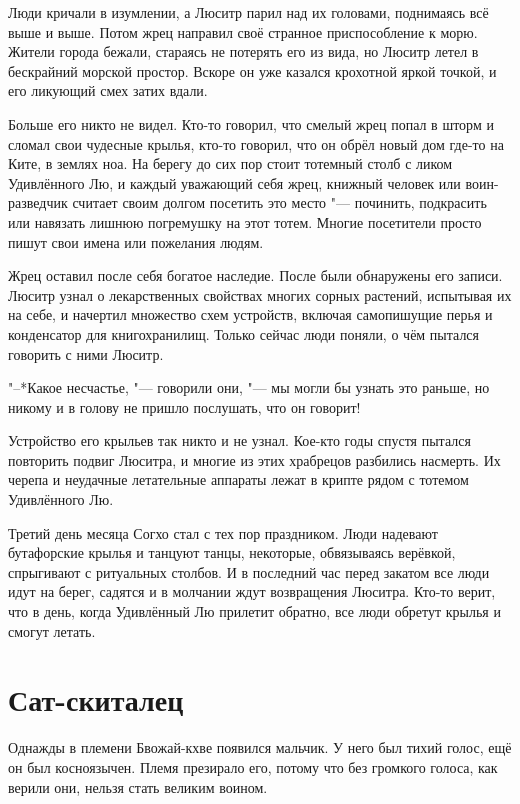 \documentclass[a4paper,10pt]{book}
\begin{document}
Люди кричали в изумлении, а Люситр парил над их головами, поднимаясь всё выше и 
выше. Потом жрец направил своё странное приспособление к морю. Жители города 
бежали, стараясь не потерять его из вида, но Люситр летел в бескрайний морской 
простор. Вскоре он уже казался крохотной яркой точкой, и его ликующий смех 
затих вдали.

Больше его никто не видел. Кто-то говорил, что смелый жрец попал в шторм и 
сломал свои чудесные крылья, кто-то говорил, что он обрёл новый дом где-то на 
Ките, в землях ноа. На берегу до сих пор стоит тотемный столб с ликом 
Удивлённого Лю, и каждый уважающий себя жрец, книжный человек или 
воин-разведчик считает своим долгом посетить это место "--- починить, 
подкрасить 
или навязать лишнюю погремушку на этот тотем. Многие посетители просто пишут 
свои имена или пожелания людям.

Жрец оставил после себя богатое наследие. После были обнаружены его записи.
Люситр узнал о лекарственных свойствах многих сорных растений, испытывая их на 
себе, 
и начертил множество схем устройств, включая самопишущие перья и конденсатор 
для книгохранилищ. Только сейчас люди поняли, о чём пытался говорить с ними 
Люситр.

"--*Какое несчастье, "--- говорили они, "--- мы могли бы узнать это раньше,
но никому и в голову не пришло послушать, что он говорит!

Устройство его крыльев так никто и не узнал. Кое-кто годы 
спустя пытался повторить подвиг Люситра, и многие из этих храбрецов разбились 
насмерть. Их черепа и неудачные летательные аппараты лежат в крипте рядом с 
тотемом Удивлённого Лю.

Третий день месяца Согхо стал с тех пор праздником. Люди надевают 
бутафорские крылья и танцуют танцы, некоторые, обвязываясь верёвкой, спрыгивают 
с ритуальных столбов. И в последний час перед закатом все люди идут на берег, 
садятся и в молчании ждут возвращения Люситра. Кто-то верит, что в день, когда 
Удивлённый Лю прилетит обратно, все люди обретут крылья и смогут летать.


\section{Сат-скиталец}

Однажды в племени Бвожай-кхве появился мальчик. У него был тихий голос, ещё он 
был косноязычен. Племя презирало его, потому что без громкого голоса, как 
верили 
они, нельзя стать великим воином.
\end{document}
